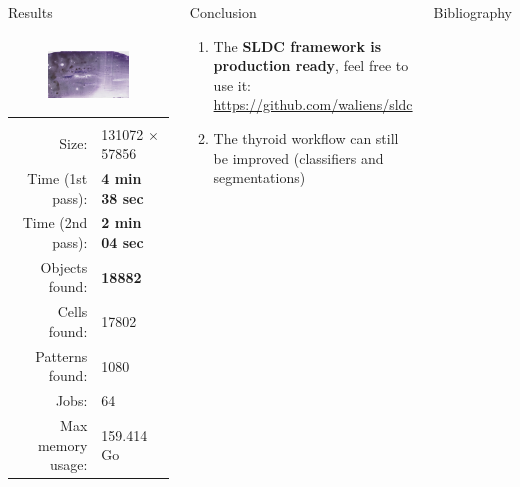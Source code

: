 \documentclass{beamer}
\begin{document}
\begin{frame}
\begin{columns}[t]
\begin{exampleblock}{Results}
\begin{columns}
		\begin{column}{0.48\linewidth}
			\begin{figure}
				\center
				\includegraphics[scale=0.35]{images/716528.png}
			\end{figure}
			
			\begin{tabular}{rl}
				& \\
				Size: & 131072 $\times$ 57856\\
				Time (1st pass): & \textbf{4 min 38 sec} \\
				Time (2nd pass): & \textbf{2 min 04 sec}  \\
				Objects found: & \textbf{18882} \\
				Cells found: & 17802 \\
				Patterns found: & 1080 \\
				Jobs: & 64 \\
				Max memory usage: & 159.414 Go \\
			\end{tabular}
		\end{column}
	\end{columns}
\end{exampleblock}
\vfill

\begin{alertblock}{Conclusion}
\begin{enumerate}
	\item The \textbf{SLDC framework is production ready}, feel free to use it: { \url{https://github.com/waliens/sldc}}
	\item The thyroid workflow can still be improved (classifiers and segmentations)
\end{enumerate}
\end{alertblock}
\begin{block}{Bibliography}
\printbibliography
\end{block}

\end{columns}
\end{frame}
\end{document}
